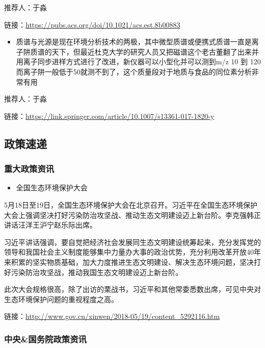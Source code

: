 \documentclass[
]{book}
\providecommand{\tightlist}{%
  \setlength{\itemsep}{0pt}\setlength{\parskip}{0pt}}
\begin{document}
推荐人：于淼

链接：\url{https://pubs.acs.org/doi/10.1021/acs.est.8b00883}

\begin{itemize}
\tightlist
\item
  质谱与光源是现在环境分析技术的两极，其中微型质谱或便携式质谱一直是离子阱质谱的天下，但最近杜克大学的研究人员又把磁谱这个老古董翻了出来并用离子同步进样方式进行了改进，新仪器可以小型化并可以测到m/z 10 到 120而离子阱一般低于50就测不到了，这个质量段对于地质与食品的同位素分析非常有用
\end{itemize}

推荐人：于淼

链接：\url{https://link.springer.com/article/10.1007/s13361-017-1820-y}

\hypertarget{ux653fux7b56ux901fux9012-1}{%
\subsection*{政策速递}\label{ux653fux7b56ux901fux9012-1}}

\hypertarget{ux91cdux5927ux653fux7b56ux8d44ux8baf-1}{%
\subsubsection*{重大政策资讯}\label{ux91cdux5927ux653fux7b56ux8d44ux8baf-1}}

\begin{itemize}
\tightlist
\item
  全国生态环境保护大会
\end{itemize}

5月18日至19日，全国生态环境保护大会在北京召开。习近平在全国生态环境保护大会上强调坚决打好污染防治攻坚战、推动生态文明建设迈上新台阶。李克强韩正讲话汪洋王沪宁赵乐际出席。

习近平讲话强调，要自觉把经济社会发展同生态文明建设统筹起来，充分发挥党的领导和我国社会主义制度能够集中力量办大事的政治优势，充分利用改革开放40年来积累的坚实物质基础，加大力度推进生态文明建设、解决生态环境问题，坚决打好污染防治攻坚战，推动我国生态文明建设迈上新台阶。

此次大会规格很高，除了出访的栗战书，习近平和其他常委悉数出席，可见中央对生态环境保护问题的重视程度之高。

链接：\url{http://www.gov.cn/xinwen/2018-05/19/content_5292116.htm}

\hypertarget{ux4e2dux592eux56fdux52a1ux9662ux653fux7b56ux8d44ux8baf-1}{%
\subsubsection*{中央\&国务院政策资讯}\label{ux4e2dux592eux56fdux52a1ux9662ux653fux7b56ux8d44ux8baf-1}}
\end{document}
